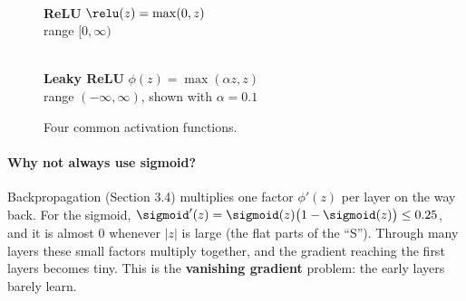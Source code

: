 \documentclass[12pt, a4paper]{article}
\begin{document}
\begin{figure}[H]
  \begin{minipage}[b]{0.48\textwidth}
    \centering
    \\[2pt]
    \textbf{ReLU} \quad $\relu(z) = \max(0, z)$\\
    {\small range $[0, \infty)$}
  \end{minipage}\hfill
  \begin{minipage}[b]{0.48\textwidth}
    \centering
    \\[2pt]
    \textbf{Leaky ReLU} \quad $\phi(z) = \max(\alpha z, z)$\\
    {\small range $(-\infty, \infty)$, shown with $\alpha = 0.1$}
  \end{minipage}
  \caption{Four common activation functions.}
  \label{fig:activations}
\end{figure}

\paragraph{Why not always use sigmoid?}
Backpropagation (Section 3.4) multiplies one factor $\phi'(z)$ per layer on
the way back. For the sigmoid, $\sigmoid'(z) = \sigmoid(z)\bigl(1-\sigmoid(z)\bigr)
  \le 0.25$, and it is almost $0$ whenever $|z|$ is large (the flat parts of the
``S''). Through many layers these small factors multiply together, and the
gradient reaching the first layers becomes tiny. This is the
\textbf{vanishing gradient} problem: the early layers barely learn.
\end{document}
